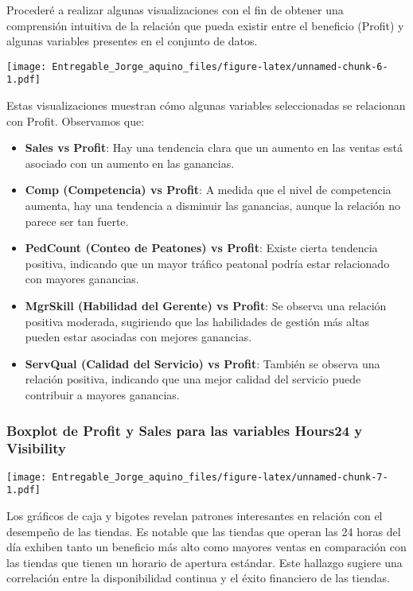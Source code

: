 \documentclass[
]{article}
\begin{document}
Procederé a realizar algunas visualizaciones con el fin de obtener una
comprensión intuitiva de la relación que pueda existir entre el
beneficio (Profit) y algunas variables presentes en el conjunto de
datos.

\texttt{[image: Entregable\_Jorge\_aquino\_files/figure-latex/unnamed-chunk-6-1.pdf]}

Estas visualizaciones muestran cómo algunas variables seleccionadas se
relacionan con Profit. Observamos que:

\begin{itemize}
\item
  \textbf{Sales vs Profit}: Hay una tendencia clara que un aumento en
  las ventas está asociado con un aumento en las ganancias.
\item
  \textbf{Comp (Competencia) vs Profit}: A medida que el nivel de
  competencia aumenta, hay una tendencia a disminuir las ganancias,
  aunque la relación no parece ser tan fuerte.
\item
  \textbf{PedCount (Conteo de Peatones) vs Profit}: Existe cierta
  tendencia positiva, indicando que un mayor tráfico peatonal podría
  estar relacionado con mayores ganancias.
\item
  \textbf{MgrSkill (Habilidad del Gerente) vs Profit}: Se observa una
  relación positiva moderada, sugiriendo que las habilidades de gestión
  más altas pueden estar asociadas con mejores ganancias.
\item
  \textbf{ServQual (Calidad del Servicio) vs Profit}: También se observa
  una relación positiva, indicando que una mejor calidad del servicio
  puede contribuir a mayores ganancias.
\end{itemize}

\hypertarget{boxplot-de-profit-y-sales-para-las-variables-hours24-y-visibility}{%
\subsubsection{Boxplot de Profit y Sales para las variables Hours24 y
Visibility}\label{boxplot-de-profit-y-sales-para-las-variables-hours24-y-visibility}}

\texttt{[image: Entregable\_Jorge\_aquino\_files/figure-latex/unnamed-chunk-7-1.pdf]}

Los gráficos de caja y bigotes revelan patrones interesantes en relación
con el desempeño de las tiendas. Es notable que las tiendas que operan
las 24 horas del día exhiben tanto un beneficio más alto como mayores
ventas en comparación con las tiendas que tienen un horario de apertura
estándar. Este hallazgo sugiere una correlación entre la disponibilidad
continua y el éxito financiero de las tiendas.
\end{document}
